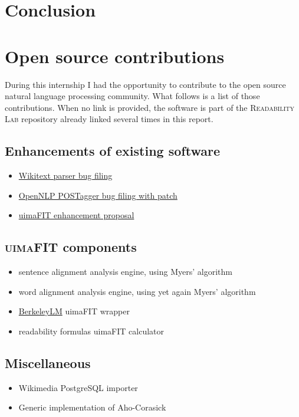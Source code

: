 \documentclass[a4paper, 11pt, onepage]{scrreprt}
\begin{document}
\chapter{Conclusion}




\appendix

\chapter{Open source contributions}
\label{cha:oss-contribs}

During this internship I had the opportunity to contribute to the open
source natural language processing community. What follows is a list
of those contributions. When no link is provided, the software is part
of the \textsc{Readability Lab} repository already linked several
times in this report.

\section{Enhancements of existing software}
\label{sec:enhancements}

\begin{itemize}
\item
  \href{https://bugs.eclipse.org/bugs/show_bug.cgi?id=433163}{Wikitext
    parser bug filing}
\item \href{https://issues.apache.org/jira/browse/OPENNLP-676}{OpenNLP
    POSTagger bug filing with patch}
\item \href{https://issues.apache.org/jira/browse/UIMA-3913}{uimaFIT
    enhancement proposal}
\end{itemize}

\section{\textsc{uimaFIT} components}
\label{sec:uimafit-components}

\begin{itemize}
\item sentence alignment analysis engine, using Myers' algorithm
\item word alignment analysis engine, using yet again Myers' algorithm
\item \href{https://berkeleylm.googlecode.com/}{BerkeleyLM} uimaFIT
  wrapper
\item readability formulas uimaFIT calculator
\end{itemize}

\section{Miscellaneous}
\label{sec:misc-software}
\begin{itemize}
\item Wikimedia PostgreSQL importer
\item Generic implementation of Aho-Corasick
\end{itemize}
\end{document}
